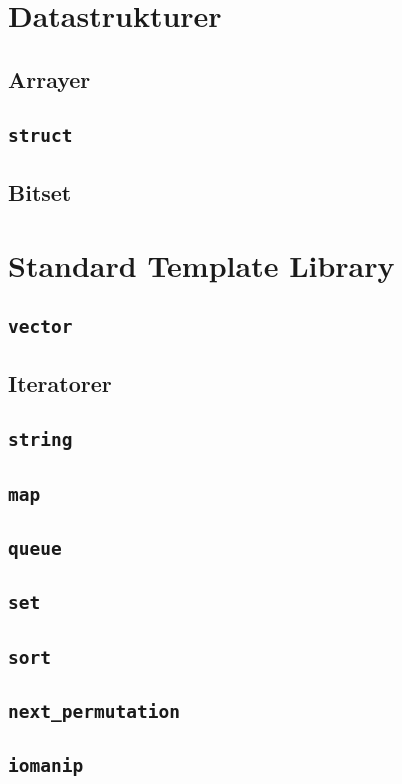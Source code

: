\documentclass[10pt,a4paper]{report}
\begin{document}
\section{Datastrukturer}
\subsection{Arrayer}

\subsection{\texttt{struct}}
\subsection{Bitset}

\section{Standard Template Library}
\subsection{\texttt{vector}}
\subsection{Iteratorer}
\subsection{\texttt{string}}
\subsection{\texttt{map}}
\subsection{\texttt{queue}}
\subsection{\texttt{set}}
\subsection{\texttt{sort}}
\subsection{\texttt{next\_permutation}}
\subsection{\texttt{iomanip}}

\end{document}
